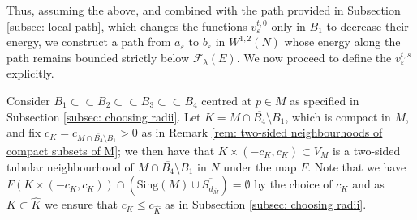 \documentclass[11pt]{article}
\begin{document}
\bigskip

Thus, assuming the above, and combined with the path provided in Subsection \ref{subsec: local path}, which changes the functions $v^{t,0}_\varepsilon$ only in $B_1$ to decrease their energy, we construct a path from $a_\varepsilon$ to $b_\varepsilon$ in $W^{1,2}(N)$ whose energy along the path remains bounded strictly below $\mathcal{F}_\lambda(E)$. We now proceed to define the $v^{t,s}_\varepsilon$ explicitly.

\bigskip

Consider $B_1 \subset \subset B_2 \subset \subset B_3 \subset \subset B_4$ centred at $p \in M$ as specified in Subsection \ref{subsec: choosing radii}. Let $K = M \cap \overline{B_4} \setminus B_1$, which is compact in $M$, and fix $c_K = c_{M \cap \overline{B_4} \setminus B_1} > 0$ as in Remark \ref{rem: two-sided neighbourhoods of compact subsets of M}; we then have that $K \times (-c_K, c_K) \subset V_M$ is a two-sided tubular neighbourhood of $M \cap \overline{B_4} \setminus B_1$ in $N$ under the map $F$. Note that we have $F\left(K \times (-c_K,c_K)\right) \cap (\mathrm{Sing}(M) \cup\overline{S_{d_{\overline{M}}}}) = \emptyset$ by the choice of $c_K$ and as $K \subset \widehat{K}$ we ensure that $c_K \leq c_{\widehat{K}}$ as in Subsection \ref{subsec: choosing radii}.

\bigskip
\end{document}
